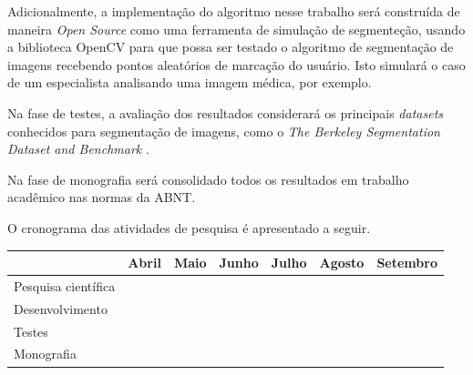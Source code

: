 Adicionalmente, a implementação do algoritmo nesse trabalho será
construída de maneira \textit{Open Source} como uma ferramenta de
simulação de segmenteção, usando a biblioteca \gls{OpenCV} para que possa
ser testado o algoritmo de segmentação de imagens recebendo pontos
aleatórios de marcação do usuário. Isto simulará o caso de um
especialista analisando uma imagem médica, por exemplo.


Na fase de testes, a avaliação dos resultados considerará os
principais \textit{datasets} conhecidos para segmentação de imagens,
como o \textit{The Berkeley Segmentation Dataset and Benchmark}
\cite{MartinFTM01}.

Na fase de monografia será consolidado todos os resultados em trabalho
acadêmico nas normas da \gls{ABNT}.

O cronograma das atividades de pesquisa é apresentado a seguir.

\begin{table}[h]
\begin{tabular}{l|l|l|l|l|l|l|}
\cline{2-7}
                                          & Abril                                         & Maio                                            & Junho                                           & Julho                                           & Agosto                                          & Setembro                                        \\ \hline
\multicolumn{1}{|l|}{Pesquisa científica} & \multicolumn{1}{c|}{\cellcolor[HTML]{000000}} & \cellcolor[HTML]{000000}{\color[HTML]{000000} } & \cellcolor[HTML]{000000}{\color[HTML]{000000} } &                                                 &                                                 &                                                 \\ \hline
\multicolumn{1}{|l|}{Desenvolvimento}     &                                               &                                                 & \cellcolor[HTML]{000000}{\color[HTML]{000000} } & \cellcolor[HTML]{000000}{\color[HTML]{000000} } &                                                 &                                                 \\ \hline
\multicolumn{1}{|l|}{Testes}              &                                               &                                                 &                                                 & \cellcolor[HTML]{000000}{\color[HTML]{000000} } & \cellcolor[HTML]{000000}{\color[HTML]{000000} } &                                                 \\ \hline
\multicolumn{1}{|l|}{Monografia}          &                                               &                                                 &                                                 &                                                 & \cellcolor[HTML]{000000}{\color[HTML]{000000} } & \cellcolor[HTML]{000000}{\color[HTML]{000000} } \\ \hline
\end{tabular}
\end{table}
